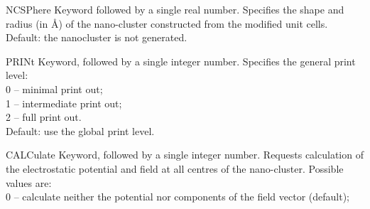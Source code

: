 \begin{keywordlist}
\item[NCSPhere]
Keyword followed by a single real number.
Specifies the shape and radius (in \AA) of the nano-cluster constructed from
the modified unit cells.
Default: the nanocluster is not generated.
\item[PRINt]
Keyword, followed by a single integer number.
Specifies the general print level:\\
\hspace*{5mm}0 -- minimal print out; \\
\hspace*{5mm}1 -- intermediate print out;\\
\hspace*{5mm}2 -- full print out. \\
Default: use the global \molcas print level.
\item[CALCulate]
Keyword, followed by a single integer number.
Requests calculation of the electrostatic potential and field at all centres of the nano-cluster.
Possible values are:\\
\hspace*{5mm}0 -- calculate neither the potential nor components of the field vector (default);\\

\end{keywordlist}
